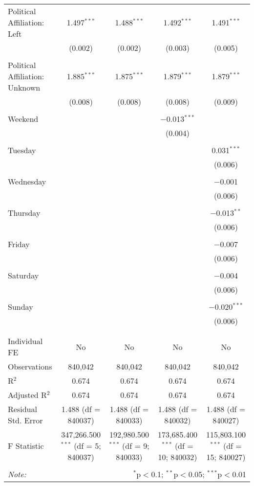 \documentclass[
]{article}
\begin{document}
\begin{table}[!htbp]
{\begin{tabular}{@{\extracolsep{5pt}}lcccc}
 Political Affiliation: Left & 1.497$^{***}$ & 1.488$^{***}$ & 1.492$^{***}$ & 1.491$^{***}$ \\ 
  & (0.002) & (0.002) & (0.003) & (0.005) \\ 
  & & & & \\ 
 Political Affiliation: Unknown & 1.885$^{***}$ & 1.875$^{***}$ & 1.879$^{***}$ & 1.879$^{***}$ \\ 
  & (0.008) & (0.008) & (0.008) & (0.009) \\ 
  & & & & \\ 
 Weekend &  &  & $-$0.013$^{***}$ &  \\ 
  &  &  & (0.004) &  \\ 
  & & & & \\ 
 Tuesday &  &  &  & 0.031$^{***}$ \\ 
  &  &  &  & (0.006) \\ 
  & & & & \\ 
 Wednesday &  &  &  & $-$0.001 \\ 
  &  &  &  & (0.006) \\ 
  & & & & \\ 
 Thursday &  &  &  & $-$0.013$^{**}$ \\ 
  &  &  &  & (0.006) \\ 
  & & & & \\ 
 Friday &  &  &  & $-$0.007 \\ 
  &  &  &  & (0.006) \\ 
  & & & & \\ 
 Saturday &  &  &  & $-$0.004 \\ 
  &  &  &  & (0.006) \\ 
  & & & & \\ 
 Sunday &  &  &  & $-$0.020$^{***}$ \\ 
  &  &  &  & (0.006) \\ 
  & & & & \\ 
\hline \\[-1.8ex] 
Individual FE & No & No & No & No \\ 
Observations & 840,042 & 840,042 & 840,042 & 840,042 \\ 
R$^{2}$ & 0.674 & 0.674 & 0.674 & 0.674 \\ 
Adjusted R$^{2}$ & 0.674 & 0.674 & 0.674 & 0.674 \\ 
Residual Std. Error & 1.488 (df = 840037) & 1.488 (df = 840033) & 1.488 (df = 840032) & 1.488 (df = 840027) \\ 
F Statistic & 347,266.500$^{***}$ (df = 5; 840037) & 192,980.500$^{***}$ (df = 9; 840033) & 173,685.400$^{***}$ (df = 10; 840032) & 115,803.100$^{***}$ (df = 15; 840027) \\ 
\hline 
\hline \\[-1.8ex] 
\textit{Note:}  & \multicolumn{4}{r}{$^{*}$p$<$0.1; $^{**}$p$<$0.05; $^{***}$p$<$0.01} \\ 
\end{tabular}
} 
\end{table} 
\newpage
\end{document}
